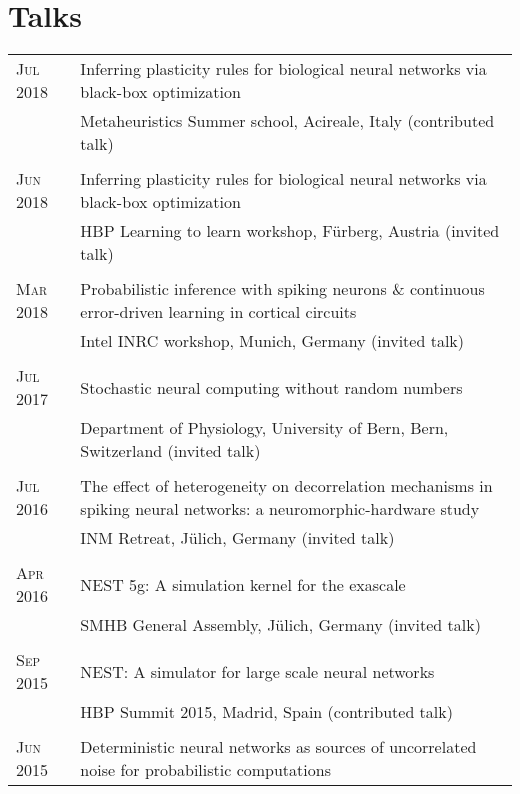 \section{Talks}
\begin{longtable}{>{\hfill}p{1.6cm}|p{}}
  \textsc{Jul} 2018 & Inferring plasticity rules for biological neural networks via black-box optimization \\
  & \footnotesize Metaheuristics Summer school, Acireale, Italy (contributed talk) \\
  \multicolumn{2}{c}{} \\
  \textsc{Jun} 2018 & Inferring plasticity rules for biological neural networks via black-box optimization \\
  & \footnotesize HBP Learning to learn workshop, F\"urberg, Austria (invited talk) \\
  \multicolumn{2}{c}{} \\
  \textsc{Mar} 2018 & Probabilistic inference with spiking neurons \& continuous error-driven learning in cortical circuits \\
  & \footnotesize Intel INRC workshop, Munich, Germany (invited talk) \\
  \multicolumn{2}{c}{} \\
  \textsc{Jul} 2017 & Stochastic neural computing without random numbers \\
  & \footnotesize Department of Physiology, University of Bern, Bern, Switzerland (invited talk) \\
  \multicolumn{2}{c}{} \\
  \textsc{Jul} 2016 & The effect of heterogeneity on decorrelation mechanisms in spiking neural networks: a neuromorphic-hardware study \\
  & \footnotesize INM Retreat, J\"ulich, Germany (invited talk)\\
  \multicolumn{2}{c}{} \\
  \textsc{Apr} 2016 & NEST 5g: A simulation kernel for the exascale \\
  & \footnotesize SMHB General Assembly, J\"ulich, Germany (invited talk)\\
  \multicolumn{2}{c}{} \\
  \textsc{Sep} 2015 & NEST: A simulator for large scale neural networks\\
  & \footnotesize HBP Summit 2015, Madrid, Spain (contributed talk)\\
  \multicolumn{2}{c}{} \\
  \textsc{Jun} 2015 & Deterministic neural networks as sources of uncorrelated noise for probabilistic computations\\

\end{longtable}
